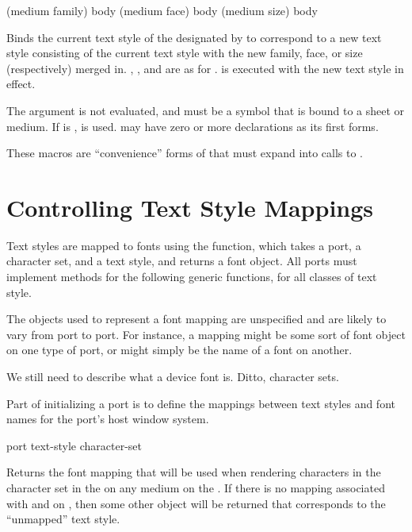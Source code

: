  {(medium family) \body body}
   {(medium face) \body body}
   {(medium size) \body body}

Binds the current text style of the  designated by  to
correspond to a new text style consisting of the current text style with the new
family, face, or size (respectively) merged in.  , , and
 are as for .   is executed with the new
text style in effect.

The  argument is not evaluated, and must be a symbol that is bound
to a sheet or medium.  If  is ,  is
used.   may have zero or more declarations as its first forms.

These macros are ``convenience'' forms of  that must expand
into calls to .


\section {Controlling Text Style Mappings}

Text styles are mapped to fonts using the  function,
which takes a port, a character set, and a text style, and returns a font
object.  All ports must implement methods for the following generic functions,
for all classes of text style.

The objects used to represent a font mapping are unspecified and are likely to
vary from port to port.  For instance, a mapping might be some sort of font
object on one type of port, or might simply be the name of a font on another.

 {We still need to describe what a device font is.  Ditto, character
sets.}

Part of initializing a port is to define the mappings between text styles and
font names for the port's host window system.

 {port text-style \optional character-set}

Returns the font mapping that will be used when rendering characters in the
character set  in the   on
any medium on the  .  If there is no mapping associated
with  and  on , then some other
object will be returned that corresponds to the ``unmapped'' text style.

